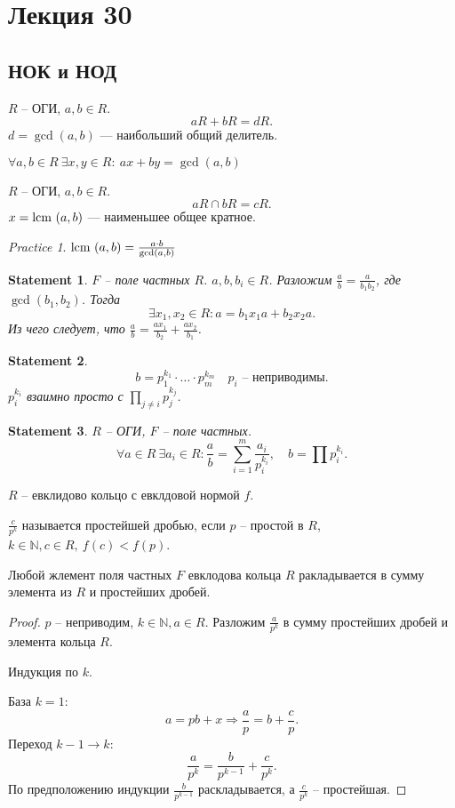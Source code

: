 \documentclass[11pt]{book}
\newcommand{\N}{\mathbb{N}}
\newcommand{\lcm}{{\mathop{\text{\rm lcm}}}~}
\theoremstyle{definition}
\theoremstyle{plain}
\theoremstyle{plain}
\newtheorem*{st}{Statement}
\theoremstyle{definition}
\theoremstyle{remark}
\newtheorem*{prac}{Practice}
\begin{document}
 \section{Лекция 30}
 \subsection{НОК и НОД}
 \begin{defn}
     $ R$ -- ОГИ, $ a, b \in  R$.\[
     aR + bR = dR
     .\] 
     $ d = \gcd (a, b)$ --- наибольший общий делитель.
 \end{defn}
 \begin{thm}
     $ \forall a, b \in  R ~\exists  x, y \in  R: ~ ax + by = \gcd(a, b)$
 \end{thm}
 \begin{defn}
     $ R$ -- ОГИ, $ a, b \in  R$.
 $$ aR \cap  bR = cR.$$
 $ x = \lcm (a, b)$ --- наименьшее общее кратное.
 \end{defn}
 \begin{prac}
     $ \lcm(a, b) = \frac{a \cdot b}{\gcd(a, b)}$
 \end{prac}
 \begin{st}
     $ F$ -- поле частных $ R$. $ a, b, b_i \in  R$.
     Разложим $ \frac{a}{b} = \frac{a}{b_1 b_2}$, где $ \gcd(b_1, b_2)$.
     Тогда \[
     \exists  x_1, x_2 \in  R: a = b_1x_1 a + b_2x_2a
     .\] 
     Из чего следует, что $ \frac{a}{b} = \frac{ax_1}{b_2} + \frac{ax_2}{b_1}$. 
 \end{st}
 \begin{st}
     \[
     b = p_1^{k_1} \cdot  \ldots  \cdot  p_m ^{k_m} \quad  p_i \text{ -- неприводимы}
     .\] 
     $ p_i^{k_i} $ взаимно просто с $ \prod_{j \ne i} p_j ^{k_j}$.
 \end{st}
 \begin{st}
     $ R$ -- ОГИ, $ F$ -- поле частных.
     \[
	 \forall a \in  R ~ \exists  a_i \in  R: \frac{a}{b} = \sum_{i=1}^{m} \frac{a_i}{p_i^{k_i}}, \quad b = \prod p_i^{k_i}
     .\] 
 \end{st}
 \begin{defn}
     $ R$ -- евклидово кольцо с евклдовой нормой $ f$.

     $ \frac{c}{p^{k}}$  называется простейшей дробью, если $ p$ -- простой в $ R$, $ k \in \N, c \in  R, ~ f(c) < f(p)$.
 \end{defn}
 \begin{thm}
     Любой жлемент поля частных $ F$ евклодова кольца $ R$ ракладывается в сумму элемента из $ R$ и простейших дробей. 
 \end{thm}
 \begin{proof}
     $ p $ -- неприводим, $ k \in  \N, a \in  R $. Разложим $ \frac{a}{p^{k}}$ в сумму простейших дробей и элемента кольца $ R$.
      
     Индукция по $ k$.

     База $ k = 1$:
      \[
     a = pb + x \Longrightarrow \frac{a}{p } = b + \frac{c}{p}
     .\] 
     Переход $ k -1 \to  k$:
     \[
     \frac{a}{p^{k}} = \frac{b}{p^{k-1}} + \frac{c}{p^{k}}
     .\] 
     По предположению индукции $ \frac{b}{p^{k-1}}$ раскладывается, а $ \frac{c}{p^{k}}$ -- простейшая.
 \end{proof}
\end{document}
